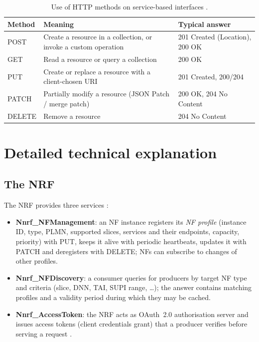 \documentclass[11pt,a4paper]{article}
\begin{document}
\begin{table}[htbp]
\centering\small
\caption{Use of HTTP methods on service-based interfaces \cite{ts29501}.}\label{tab:http}
\begin{tabularx}{\linewidth}{@{}l Y l@{}}
\toprule
{}Method & Meaning & Typical answer \\
\midrule
POST   & Create a resource in a collection, or invoke a custom operation & 201 Created (Location), 200 OK \\
GET    & Read a resource or query a collection                  & 200 OK \\
PUT    & Create or replace a resource with a client-chosen URI  & 201 Created, 200/204 \\
PATCH  & Partially modify a resource (JSON Patch / merge patch) & 200 OK, 204 No Content \\
DELETE & Remove a resource                                      & 204 No Content \\
\bottomrule
\end{tabularx}
\end{table}

\section{Detailed technical explanation}

\subsection{The NRF}
The NRF provides three services \cite{ts29510}:
\begin{itemize}
  \item \textbf{Nnrf\_NFManagement}: an NF instance registers its \emph{NF profile} (instance ID, type, PLMN, supported slices,
        services and their endpoints, capacity, priority) with PUT, keeps it alive with periodic heartbeats, updates it with
        PATCH and deregisters with DELETE; NFs can subscribe to changes of other profiles.
  \item \textbf{Nnrf\_NFDiscovery}: a consumer queries for producers by target NF type and criteria (slice, DNN, TAI,
        SUPI range, \ldots); the answer contains matching profiles and a validity period during which they may be cached.
  \item \textbf{Nnrf\_AccessToken}: the NRF acts as OAuth~2.0 authorisation server and issues access tokens (client
        credentials grant) that a producer verifies before serving a request \cite{rfc6749}.
\end{itemize}
\end{document}
